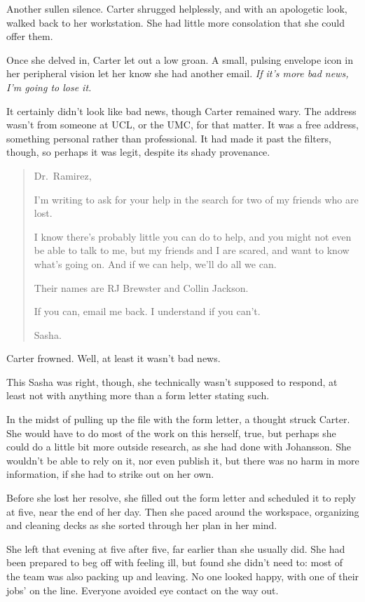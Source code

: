 Another sullen silence. Carter shrugged helplessly, and with an apologetic look, walked back to her workstation. She had little more consolation that she could offer them.

Once she delved in, Carter let out a low groan. A small, pulsing envelope icon in her peripheral vision let her know she had another email. \emph{If it's more bad news, I'm going to lose it.}

It certainly didn't look like bad news, though Carter remained wary. The address wasn't from someone at UCL, or the UMC, for that matter. It was a free address, something personal rather than professional. It had made it past the filters, though, so perhaps it was legit, despite its shady provenance.

\begin{quote}
Dr.~Ramirez,

I'm writing to ask for your help in the search for two of my friends who are lost.

I know there's probably little you can do to help, and you might not even be able to talk to me, but my friends and I are scared, and want to know what's going on. And if we can help, we'll do all we can.

Their names are RJ Brewster and Collin Jackson.

If you can, email me back. I understand if you can't.

Sasha.
\end{quote}

Carter frowned. Well, at least it wasn't bad news.

This Sasha was right, though, she technically wasn't supposed to respond, at least not with anything more than a form letter stating such.

In the midst of pulling up the file with the form letter, a thought struck Carter. She would have to do most of the work on this herself, true, but perhaps she could do a little bit more outside research, as she had done with Johansson. She wouldn't be able to rely on it, nor even publish it, but there was no harm in more information, if she had to strike out on her own.

Before she lost her resolve, she filled out the form letter and scheduled it to reply at five, near the end of her day. Then she paced around the workspace, organizing and cleaning decks as she sorted through her plan in her mind.

She left that evening at five after five, far earlier than she usually did. She had been prepared to beg off with feeling ill, but found she didn't need to: most of the team was also packing up and leaving. No one looked happy, with one of their jobs' on the line. Everyone avoided eye contact on the way out.

